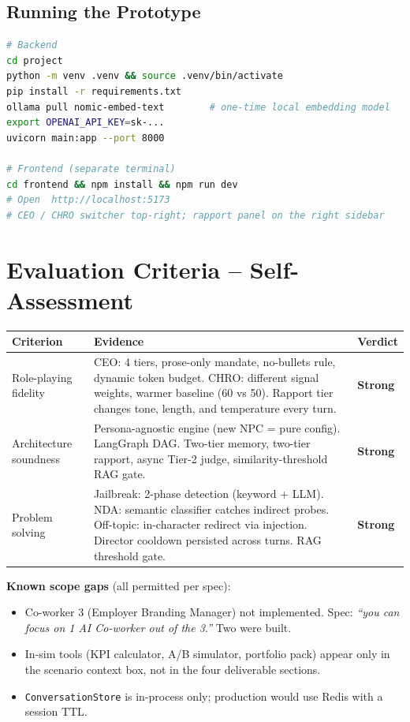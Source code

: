 \documentclass[11pt,a4paper]{article}
\begin{document}
\subsection{Running the Prototype}

\begin{lstlisting}[language=bash, caption={Setup and run}]
# Backend
cd project
python -m venv .venv && source .venv/bin/activate
pip install -r requirements.txt
ollama pull nomic-embed-text        # one-time local embedding model
export OPENAI_API_KEY=sk-...
uvicorn main:app --port 8000

# Frontend (separate terminal)
cd frontend && npm install && npm run dev
# Open  http://localhost:5173
# CEO / CHRO switcher top-right; rapport panel on the right sidebar
\end{lstlisting}

\section*{Evaluation Criteria -- Self-Assessment}

\begin{center}
\begin{tabularx}{0.96\linewidth}{@{}lXl@{}}
\toprule
\textbf{Criterion} & \textbf{Evidence} & \textbf{Verdict} \\
\midrule
Role-playing fidelity &
  CEO: 4 tiers, prose-only mandate, no-bullets rule, dynamic token budget.
  CHRO: different signal weights, warmer baseline (60 vs 50).
  Rapport tier changes tone, length, and temperature every turn. &
  \textcolor{emeraldcol}{\textbf{Strong}} \\[4pt]
Architecture soundness &
  Persona-agnostic engine (new NPC = pure config). LangGraph DAG.
  Two-tier memory, two-tier rapport, async Tier-2 judge,
  similarity-threshold RAG gate. &
  \textcolor{emeraldcol}{\textbf{Strong}} \\[4pt]
Problem solving &
  Jailbreak: 2-phase detection (keyword + LLM). NDA: semantic classifier
  catches indirect probes. Off-topic: in-character redirect via injection.
  Director cooldown persisted across turns. RAG threshold gate. &
  \textcolor{emeraldcol}{\textbf{Strong}} \\
\bottomrule
\end{tabularx}
\end{center}

\vspace{0.5em}
\noindent\textbf{Known scope gaps} (all permitted per spec):
\begin{itemize}[leftmargin=*,noitemsep,topsep=2pt]
  \item Co-worker 3 (Employer Branding Manager) not implemented.
        Spec: \emph{``you can focus on 1 AI Co-worker out of the 3.''} Two were built.
  \item In-sim tools (KPI calculator, A/B simulator, portfolio pack) appear only in
        the scenario context box, not in the four deliverable sections.
  \item \texttt{ConversationStore} is in-process only; production would use Redis
        with a session TTL.
\end{itemize}
\end{document}
